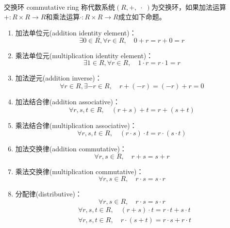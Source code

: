 \begin{definition}{交换环 commutative ring}
	称代数系统$(R,+,\;\cdot\;)$为交换环，如果加法运算$+:R\times R\to R$和乘法运算$\cdot :R\times R\to R$成立如下命题。
	\begin{enumerate}
		\item 加法单位元(addition identity element)：
		$$
		\exists 0\in R,\forall r\in R,\quad 0+r=r+0=r
		$$
		\item 乘法单位元(multiplication identity element)：
		$$
		\exists 1\in R,\forall r\in R,\quad 1\cdot r=r\cdot 1=r
		$$
		\item 加法逆元(addition inverse)：
		$$
		\forall r\in R,\exists-r\in R,\quad r+(-r)=(-r)+r=0
		$$
		\item 加法结合律(addition associative)：
		$$
		\forall r,s,t\in R,\quad (r+s)+t=r+(s+t)
		$$
		\item 乘法结合律(multiplication associative)：
		$$
		\forall r,s,t\in R,\quad (r\cdot s)\cdot t=r\cdot (s\cdot t)
		$$
		\item 加法交换律(addition commutative)：
		$$
		\forall r,s\in R,\quad r+s=s+r
		$$
		\item 乘法交换律(multiplication commutative)：
		$$
		\forall r,s\in R,\quad r\cdot s=s\cdot r
		$$
		\item 分配律(distributive)：
		$$
		\forall r,s\in R,\quad r\cdot s=s\cdot r
		$$
		\begin{align*}
			&\forall r,s,t\in R,\quad (r+s)\cdot t=r\cdot t+s\cdot t\\
			&\forall r,s,t\in R,\quad r\cdot(s+t)=r\cdot s+r\cdot t
		\end{align*}
	\end{enumerate}
\end{definition}

